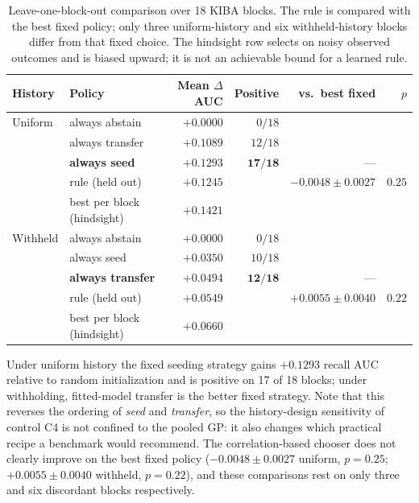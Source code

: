 \documentclass[10pt]{article}
\begin{document}
\begin{table}[htbp]
\centering\small
\begin{tabular}{llrrrr}
\toprule
History & Policy & Mean $\Delta$AUC & Positive & vs.\ best fixed & $p$ \\
\midrule
Uniform  & always abstain   & $+0.0000$ & $0/18$  &           &        \\
         & always transfer  & $+0.1089$ & $12/18$ &           &        \\
         & \textbf{always seed} & $\mathbf{+0.1293}$ & $\mathbf{17/18}$ & --- & \\
         & rule (held out)  & $+0.1245$ &         & $-0.0048 \pm 0.0027$ & $0.25$ \\
         & best per block (hindsight) & $+0.1421$ &        &           & \\
\midrule
Withheld & always abstain   & $+0.0000$ & $0/18$  &           &        \\
         & always seed      & $+0.0350$ & $10/18$ &           &        \\
         & \textbf{always transfer} & $\mathbf{+0.0494}$ & $\mathbf{12/18}$ & --- & \\
         & rule (held out)  & $+0.0549$ &         & $+0.0055 \pm 0.0040$ & $0.22$ \\
         & best per block (hindsight) & $+0.0660$ &        &           & \\
\bottomrule
\end{tabular}
\caption{Leave-one-block-out comparison over 18 KIBA blocks. The rule is
compared with the best fixed policy; only three uniform-history and six
withheld-history blocks differ from that fixed choice. The hindsight row
selects on noisy observed outcomes and is biased upward; it is not an
achievable bound for a learned rule.}
\label{tab:rule}
\end{table}

Under uniform history the fixed seeding strategy gains $+0.1293$ recall AUC
relative to random initialization and is positive on 17 of 18 blocks; under
withholding, fitted-model transfer is the better fixed strategy. Note that
this reverses the ordering of \emph{seed} and \emph{transfer}, so the
history-design sensitivity of control C4 is not confined to the pooled GP: it
also changes which practical recipe a benchmark would recommend. The
correlation-based chooser does not clearly improve on the best fixed policy
($-0.0048\pm0.0027$ uniform, $p=0.25$; $+0.0055\pm0.0040$ withheld,
$p=0.22$), and these comparisons rest on only three and six discordant
blocks respectively.
\end{document}
